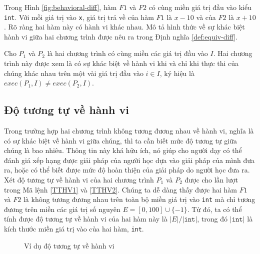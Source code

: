 Trong Hình \ref{fig:behavioral-diff}, hàm $F1$ và $F2$ có cùng miền
giá trị đầu vào kiểu \texttt{int}. Với mỗi giá trị vào \texttt{x}, giá
trị trả về của hàm $F1$ là $x - 10$ và của $F2$ là $x + 10$. Rõ ràng
hai hàm này có hành vi khác nhau. Mô tả hình thức về sự khác biệt hành
vi giữa hai chương trình được nêu ra trong Định nghĩa
\ref{def:equiv-diff}.

\begin{definition}
  \label{def:equiv-diff}
  Cho $P_{1}$ và $P_{2}$ là hai chương trình có cùng miền các giá trị
  đầu vào $I$. Hai chương trình này được xem là có sự khác biệt về
  hành vi khi và chỉ khi thực thi của chúng khác nhau trên một vài giá
  trị đầu vào $i \in I$, ký hiệu là
  $exec(P_{1}, I) \neq exec(P_{2}, I)$.
\end{definition}

\subsection{Độ tương tự về hành vi}

Trong trường hợp hai chương trình không tương đương nhau về hành vi,
nghĩa là có sự khác biệt về hành vi giữa chúng, thì ta cần biết mức độ
tương tự giữa chúng là bao nhiêu. Thông tin này khá hữu ích, nó giúp
cho người dạy có thể đánh giá xếp hạng được giải pháp của người học
dựa vào giải pháp của mình đưa ra, hoặc có thể biết được mức độ hoàn
thiện của giải pháp do người học đưa ra. Xét độ tương tự về hành vi
của hai chương trình $P_{1}$ và $P_{2}$ được cho lần lượt trong Mã
lệnh \ref{TTHV1} và \ref{TTHV2}. Chúng ta dễ dàng thấy được hai hàm
$F1$ và $F2$ là không tương đương nhau trên toàn bộ miền giá trị vào
\texttt{int} mà chỉ tương đương trên miền các giá trị số nguyên
$E = [0,100] \cup \{-1\}$. Từ đó, ta có thể tính được độ tương tự về
hành vi của hai hàm này là $|E| / |\texttt{int}|$, trong đó
$|\mathtt{int}|$ là kích thước miền giá trị vào của hai hàm,
\texttt{int}.

\begin{figure}[H]
	\centering
	\caption{Ví dụ độ tương tự về hành vi}
	\label{fig:behavioral-sim}
	\begin{minipage}[t]{0.45\linewidth}
	  
	\end{minipage}%
	\hfill\vrule\hfill
	\begin{minipage}[t]{0.45\linewidth}
	  
	\end{minipage}%
\end{figure}

